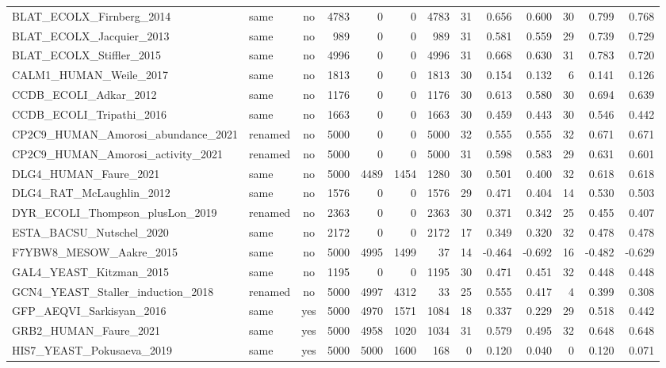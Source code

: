 \documentclass[11pt,a4paper]{article}
\begin{document}
\begin{landscape}
\begin{longtable}{llcrrrrrrrrrr}
BLAT\_ECOLX\_Firnberg\_2014 & same & no & 4783 & 0 & 0 & 4783 & 31 & 0.656 & 0.600 & 30 & 0.799 & 0.768 \\
BLAT\_ECOLX\_Jacquier\_2013 & same & no & 989 & 0 & 0 & 989 & 31 & 0.581 & 0.559 & 29 & 0.739 & 0.729 \\
BLAT\_ECOLX\_Stiffler\_2015 & same & no & 4996 & 0 & 0 & 4996 & 31 & 0.668 & 0.630 & 31 & 0.783 & 0.720 \\
CALM1\_HUMAN\_Weile\_2017 & same & no & 1813 & 0 & 0 & 1813 & 30 & 0.154 & 0.132 & 6 & 0.141 & 0.126 \\
CCDB\_ECOLI\_Adkar\_2012 & same & no & 1176 & 0 & 0 & 1176 & 30 & 0.613 & 0.580 & 30 & 0.694 & 0.639 \\
CCDB\_ECOLI\_Tripathi\_2016 & same & no & 1663 & 0 & 0 & 1663 & 30 & 0.459 & 0.443 & 30 & 0.546 & 0.442 \\
CP2C9\_HUMAN\_Amorosi\_abundance\_2021 & renamed & no & 5000 & 0 & 0 & 5000 & 32 & 0.555 & 0.555 & 32 & 0.671 & 0.671 \\
CP2C9\_HUMAN\_Amorosi\_activity\_2021 & renamed & no & 5000 & 0 & 0 & 5000 & 31 & 0.598 & 0.583 & 29 & 0.631 & 0.601 \\
DLG4\_HUMAN\_Faure\_2021 & same & no & 5000 & 4489 & 1454 & 1280 & 30 & 0.501 & 0.400 & 32 & 0.618 & 0.618 \\
DLG4\_RAT\_McLaughlin\_2012 & same & no & 1576 & 0 & 0 & 1576 & 29 & 0.471 & 0.404 & 14 & 0.530 & 0.503 \\
DYR\_ECOLI\_Thompson\_plusLon\_2019 & renamed & no & 2363 & 0 & 0 & 2363 & 30 & 0.371 & 0.342 & 25 & 0.455 & 0.407 \\
ESTA\_BACSU\_Nutschel\_2020 & same & no & 2172 & 0 & 0 & 2172 & 17 & 0.349 & 0.320 & 32 & 0.478 & 0.478 \\
F7YBW8\_MESOW\_Aakre\_2015 & same & no & 5000 & 4995 & 1499 & 37 & 14 & -0.464 & -0.692 & 16 & -0.482 & -0.629 \\
GAL4\_YEAST\_Kitzman\_2015 & same & no & 1195 & 0 & 0 & 1195 & 30 & 0.471 & 0.451 & 32 & 0.448 & 0.448 \\
GCN4\_YEAST\_Staller\_induction\_2018 & renamed & no & 5000 & 4997 & 4312 & 33 & 25 & 0.555 & 0.417 & 4 & 0.399 & 0.308 \\
GFP\_AEQVI\_Sarkisyan\_2016 & same & yes & 5000 & 4970 & 1571 & 1084 & 18 & 0.337 & 0.229 & 29 & 0.518 & 0.442 \\
GRB2\_HUMAN\_Faure\_2021 & same & yes & 5000 & 4958 & 1020 & 1034 & 31 & 0.579 & 0.495 & 32 & 0.648 & 0.648 \\
HIS7\_YEAST\_Pokusaeva\_2019 & same & yes & 5000 & 5000 & 1600 & 168 & 0 & 0.120 & 0.040 & 0 & 0.120 & 0.071 \\

\end{longtable}
\end{landscape}
\end{document}
